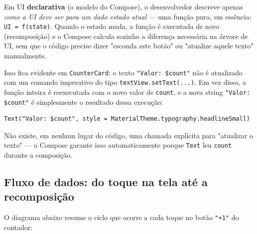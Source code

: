 \documentclass[11pt,a4paper]{article}
\begin{document}
Em UI \textbf{declarativa} (o modelo do Compose), o desenvolvedor
descreve apenas \emph{como a UI deve ser para um dado estado atual} — uma
função pura, em essência: \texttt{UI = f(state)}. Quando o estado muda, a
função é executada de novo (recomposição) e o Compose calcula sozinho a
diferença necessária na árvore de UI, sem que o código precise dizer
"esconda este botão" ou "atualize aquele texto" manualmente.

Isso fica evidente em \texttt{CounterCard}: o texto \texttt{"Valor:
\$count"} não é atualizado com um comando imperativo do tipo
\texttt{textView.setText(...)}. Em vez disso, a função inteira é
reexecutada com o novo valor de \texttt{count}, e a nova string
\texttt{"Valor: \$count"} é simplesmente o resultado dessa execução:

\begin{lstlisting}[caption={UI = f(state): o texto e apenas funcao do estado atual}, label=lst:declarativa]
Text("Valor: $count", style = MaterialTheme.typography.headlineSmall)
\end{lstlisting}

Não existe, em nenhum lugar do código, uma chamada explícita para
"atualizar o texto" — o Compose garante isso automaticamente porque
\texttt{Text} leu \texttt{count} durante a composição.

\subsection{Fluxo de dados: do toque na tela até a recomposição}

O diagrama abaixo resume o ciclo que ocorre a cada toque no botão
\texttt{"+1"} do contador:

\begin{center}
\end{center}
\end{document}
